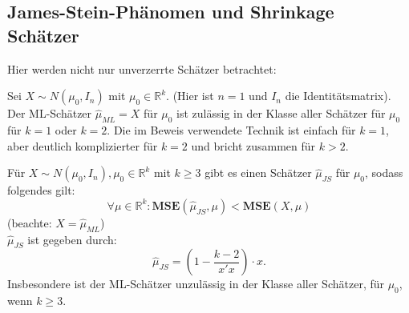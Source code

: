 \documentclass[10pt]{article}
\newcommand{\IR}{\mathbb{R}} %
\newcommand{\MSE}{\textbf{MSE}} %
\begin{document}
	\subsection{James-Stein-Phänomen und Shrinkage Schätzer}

	Hier werden nicht nur unverzerrte Schätzer betrachtet:
	
	\begin{Proposition}
		Sei $X \sim N(\mu_0, I_n)$ mit $\mu_0 \in \IR^k.$ (Hier ist $n=1$ und $I_n$ die Identitätsmatrix). Der ML-Schätzer $\hat{\mu}_{ML} = X$ für $\mu_0$ ist zulässig in der Klasse aller Schätzer für $\mu_0$ für $k=1$ oder $k=2$. Die im Beweis verwendete Technik ist einfach für $k=1$, aber deutlich komplizierter für $k=2$ und bricht zusammen für $k>2$. 
		
		Für $X \sim N(\mu_0, I_n), \mu_0 \in \IR^k$ mit $k \geq 3$ gibt es einen Schätzer $\hat{\mu}_{JS}$ für $\mu_0$, sodass folgendes gilt:
		\begin{equation*}
			\forall \mu \in \IR^k: \MSE(\hat{\mu}_{JS}, \mu) < \MSE(X,\mu)
		\end{equation*} (beachte: $X = \hat{\mu}_{ML}$) \\
		$\hat{\mu}_{JS}$ ist gegeben durch:
		\begin{equation*}
			\hat{\mu}_{JS} = \left(1-\frac{k-2}{x'x}\right) \cdot x.
		\end{equation*}
		Insbesondere ist der ML-Schätzer unzulässig in der Klasse aller Schätzer, für $\mu_0$, wenn $k \geq 3$. 
	\end{Proposition}
\end{document}
